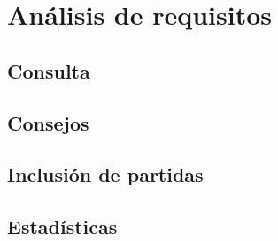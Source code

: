 \documentclass[a4paper, 11pt]{article}
\begin{document}
\newpage
\section{Análisis de requisitos}

\subsection{Consulta}


\subsection{Consejos}


\subsection{Inclusión de partidas}


\subsection{Estadísticas}

	
\end{document}
